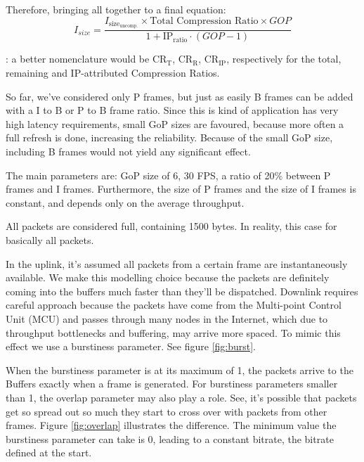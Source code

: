 \begin{itemize}
    Therefore, bringing all together to a final equation:
    \begin{equation}
        I_{size} = \frac{I_{{\text{size}}_\text{uncomp.}} \times \text{Total Compression Ratio} \times GOP}{1 + \text{IP}_\text{ratio} \cdot (GOP - 1)}
    \end{equation}

    : a better nomenclature would be $\text{CR}_\text{T}$, $\text{CR}_\text{R}$, $\text{CR}_\text{IP}$, respectively for the total, remaining and IP-attributed Compression Ratios.

\end{itemize}



So far, we've considered only P frames, but just as easily B frames can be added with a I to B or P to B frame ratio. Since this is kind of application has very high latency requirements, small GoP sizes are favoured, because more often a full refresh is done, increasing the reliability. Because of the small GoP size, including B frames would not yield any significant effect. 

The main parameters are: \acs{GoP} size of 6, 30 \acs{FPS}, a ratio of 20\% between P frames and I frames. Furthermore, the size of P frames and the size of I frames is constant, and depends only on the average throughput.

All packets are considered full, containing 1500 bytes. In reality, this case for basically all packets.

In the uplink, it's assumed all packets from a certain frame are instantaneously available. We make this modelling choice because the packets are definitely coming into the buffers much faster than they'll be dispatched. Downlink requires careful approach because the packets have come from the Multi-point Control Unit (MCU) and passes through many nodes in the Internet, which due to throughput bottlenecks and buffering, may arrive more spaced. To mimic this effect we use a burstiness parameter. See figure \ref{fig:burst}.



When the burstiness parameter is at its maximum of 1, the packets arrive to the Buffers exactly when a frame is generated. For burstiness parameters smaller than 1, the overlap parameter may also play a role. See, it's possible that packets get so spread out so much they start to cross over with packets from other frames. Figure \ref{fig:overlap} illustrates the difference. The minimum value the burstiness parameter can take is 0, leading to a constant bitrate, the bitrate defined at the start.


